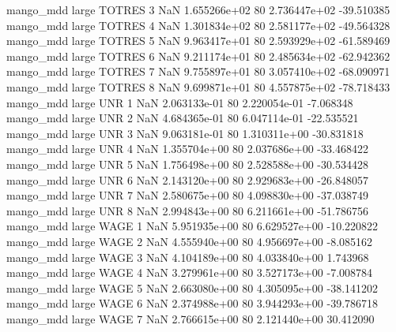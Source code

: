         mango_mdd      large   TOTRES                 3                  NaN 1.655266e+02 80   2.736447e+02         -39.510385
        mango_mdd      large   TOTRES                 4                  NaN 1.301834e+02 80   2.581177e+02         -49.564328
        mango_mdd      large   TOTRES                 5                  NaN 9.963417e+01 80   2.593929e+02         -61.589469
        mango_mdd      large   TOTRES                 6                  NaN 9.211174e+01 80   2.485634e+02         -62.942362
        mango_mdd      large   TOTRES                 7                  NaN 9.755897e+01 80   3.057410e+02         -68.090971
        mango_mdd      large   TOTRES                 8                  NaN 9.699871e+01 80   4.557875e+02         -78.718433
        mango_mdd      large      UNR                 1                  NaN 2.063133e-01 80   2.220054e-01          -7.068348
        mango_mdd      large      UNR                 2                  NaN 4.684365e-01 80   6.047114e-01         -22.535521
        mango_mdd      large      UNR                 3                  NaN 9.063181e-01 80   1.310311e+00         -30.831818
        mango_mdd      large      UNR                 4                  NaN 1.355704e+00 80   2.037686e+00         -33.468422
        mango_mdd      large      UNR                 5                  NaN 1.756498e+00 80   2.528588e+00         -30.534428
        mango_mdd      large      UNR                 6                  NaN 2.143120e+00 80   2.929683e+00         -26.848057
        mango_mdd      large      UNR                 7                  NaN 2.580675e+00 80   4.098830e+00         -37.038749
        mango_mdd      large      UNR                 8                  NaN 2.994843e+00 80   6.211661e+00         -51.786756
        mango_mdd      large     WAGE                 1                  NaN 5.951935e+00 80   6.629527e+00         -10.220822
        mango_mdd      large     WAGE                 2                  NaN 4.555940e+00 80   4.956697e+00          -8.085162
        mango_mdd      large     WAGE                 3                  NaN 4.104189e+00 80   4.033840e+00           1.743968
        mango_mdd      large     WAGE                 4                  NaN 3.279961e+00 80   3.527173e+00          -7.008784
        mango_mdd      large     WAGE                 5                  NaN 2.663080e+00 80   4.305095e+00         -38.141202
        mango_mdd      large     WAGE                 6                  NaN 2.374988e+00 80   3.944293e+00         -39.786718
        mango_mdd      large     WAGE                 7                  NaN 2.766615e+00 80   2.121440e+00          30.412090
